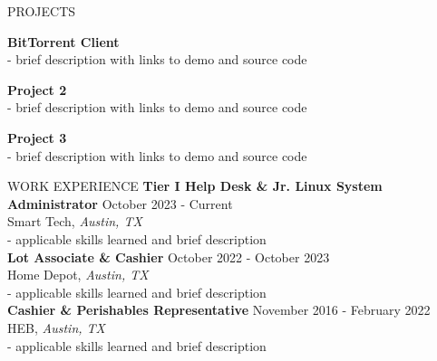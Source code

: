 \documentclass{resume} %
\begin{document}
\begin{rSection}{PROJECTS}
\vspace{-1.25em}
\item \textbf{BitTorrent Client}{} \\
- brief description with links to demo and source code
\item \textbf{Project 2}{} \\
- brief description with links to demo and source code
\item \textbf{Project 3}{} \\
- brief description with links to demo and source code
\end{rSection} 

\begin{rSection}{WORK EXPERIENCE}
\textbf{Tier I Help Desk \& Jr. Linux System Administrator} \hfill October 2023 - Current \\
Smart Tech, \textit{Austin, TX} \\
    - applicable skills learned and brief description \\
\textbf{Lot Associate \& Cashier} \hfill October 2022 - October 2023 \\
Home Depot, \textit{Austin, TX} \\
    - applicable skills learned and brief description \\
\textbf{Cashier \& Perishables Representative} \hfill November 2016 - February 2022 \\
HEB, \textit{Austin, TX} \\
    - applicable skills learned and brief description
\end{rSection} 

\end{document}
